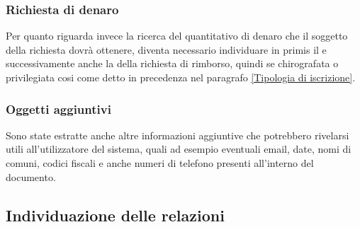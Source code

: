 \subsubsection{Richiesta di denaro}
Per quanto riguarda invece la ricerca del quantitativo di denaro che il soggetto della richiesta dovrà ottenere, diventa necessario individuare in primis il  e successivamente anche la  della richiesta di rimborso, quindi se chirografata o privilegiata cosi come detto in precedenza nel paragrafo \ref{Tipologia di iscrizione}.

\subsubsection{Oggetti aggiuntivi}
Sono state estratte anche altre informazioni aggiuntive che potrebbero rivelarsi utili all'utilizzatore del sistema, quali ad esempio eventuali email, date, nomi di comuni, codici fiscali e anche numeri di telefono presenti all'interno del documento.

\subsection{Individuazione delle relazioni}
